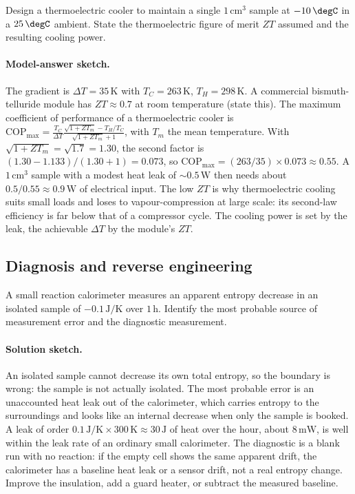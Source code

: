 \begin{exercise}
Design a thermoelectric cooler to maintain a single $1\,\text{cm}^3$
sample at $-10\,\degC$ in a $25\,\degC$ ambient. State the
thermoelectric figure of merit $ZT$ assumed and the resulting cooling
power.

\paragraph{Model-answer sketch.} The gradient is
$\Delta T = 35\,\si{\kelvin}$ with $T_C = 263\,\si{\kelvin}$,
$T_H = 298\,\si{\kelvin}$. A commercial bismuth-telluride module has
$ZT \approx 0.7$ at room temperature (state this). The maximum coefficient
of performance of a thermoelectric cooler is
$\mathrm{COP}_{\max} = \frac{T_C}{\Delta T}
\frac{\sqrt{1+ZT_m}-T_H/T_C}{\sqrt{1+ZT_m}+1}$, with
$T_m$ the mean temperature. With $\sqrt{1+ZT_m} = \sqrt{1.7} = 1.30$,
the second factor is $(1.30 - 1.133)/(1.30 + 1) = 0.073$, so
$\mathrm{COP}_{\max} = (263/35)\times 0.073 \approx 0.55$. A
$1\,\text{cm}^3$ sample with a modest heat leak of $\sim 0.5\,\text{W}$
then needs about $0.5/0.55 \approx 0.9\,\text{W}$ of electrical input.
The low $ZT$ is why thermoelectric cooling suits small loads and loses
to vapour-compression at large scale: its second-law efficiency is far
below that of a compressor cycle. The cooling power is set by the leak,
the achievable $\Delta T$ by the module's $ZT$.
\end{exercise}

\subsection*{Diagnosis and reverse engineering}

\begin{exercise}
A small reaction calorimeter measures an apparent entropy decrease in
an isolated sample of $-0.1\,\text{J}/\si{\kelvin}$ over $1\,\text{h}$.
Identify the most probable source of measurement error and the
diagnostic measurement.

\paragraph{Solution sketch.} An isolated sample cannot decrease its own
total entropy, so the boundary is wrong: the sample is not actually
isolated. The most probable error is an unaccounted heat leak out of the
calorimeter, which carries entropy to the surroundings and looks like an
internal decrease when only the sample is booked. A leak of order
$0.1\,\text{J}/\si{\kelvin}\times 300\,\si{\kelvin} \approx 30\,\text{J}$
of heat over the hour, about $8\,\text{mW}$, is well within the leak rate
of an ordinary small calorimeter. The diagnostic is a blank run with no
reaction: if the empty cell shows the same apparent drift, the
calorimeter has a baseline heat leak or a sensor drift, not a real
entropy change. Improve the insulation, add a guard heater, or subtract
the measured baseline.
\end{exercise}

